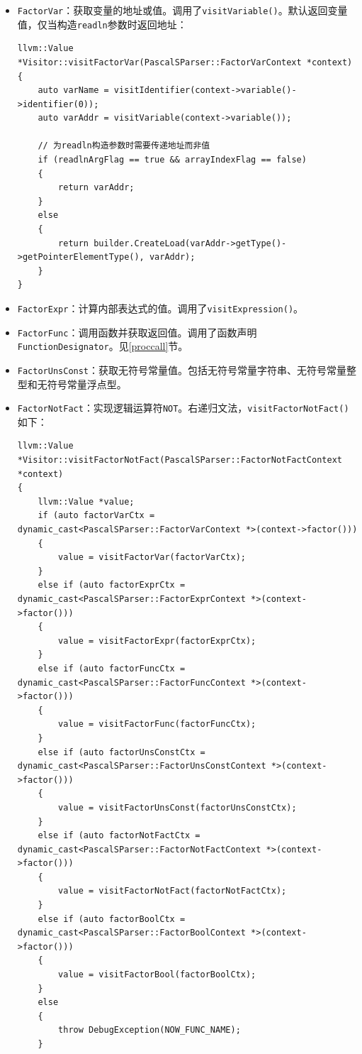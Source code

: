\documentclass[lang=cn,11pt,a4paper,cite=authornum]{paper}
\begin{document}
\begin{itemize}
    \item \texttt{FactorVar}：获取变量的地址或值。调用了\texttt{visitVariable()}。默认返回变量值，仅当构造\texttt{readln}参数时返回地址：
          \begin{code}
              \begin{verbatim}
llvm::Value *Visitor::visitFactorVar(PascalSParser::FactorVarContext *context)
{
    auto varName = visitIdentifier(context->variable()->identifier(0));
    auto varAddr = visitVariable(context->variable());

    // 为readln构造参数时需要传递地址而非值
    if (readlnArgFlag == true && arrayIndexFlag == false)
    {
        return varAddr;
    }
    else
    {
        return builder.CreateLoad(varAddr->getType()->getPointerElementType(), varAddr);
    }
}
    \end{verbatim}
          \end{code}
    \item \texttt{FactorExpr}：计算内部表达式的值。调用了\texttt{visitExpression()}。
    \item \texttt{FactorFunc}：调用函数并获取返回值。调用了函数声明\texttt{FunctionDesignator}。见\ref{proccall}节。
    \item \texttt{FactorUnsConst}：获取无符号常量值。包括无符号常量字符串、无符号常量整型和无符号常量浮点型。
    \item \texttt{FactorNotFact}：实现逻辑运算符\texttt{NOT}。右递归文法，\texttt{visitFactorNotFact()}如下：
          \begin{code}
              \begin{verbatim}
llvm::Value *Visitor::visitFactorNotFact(PascalSParser::FactorNotFactContext *context)
{
    llvm::Value *value;
    if (auto factorVarCtx = dynamic_cast<PascalSParser::FactorVarContext *>(context->factor()))
    {
        value = visitFactorVar(factorVarCtx);
    }
    else if (auto factorExprCtx = dynamic_cast<PascalSParser::FactorExprContext *>(context->factor()))
    {
        value = visitFactorExpr(factorExprCtx);
    }
    else if (auto factorFuncCtx = dynamic_cast<PascalSParser::FactorFuncContext *>(context->factor()))
    {
        value = visitFactorFunc(factorFuncCtx);
    }
    else if (auto factorUnsConstCtx = dynamic_cast<PascalSParser::FactorUnsConstContext *>(context->factor()))
    {
        value = visitFactorUnsConst(factorUnsConstCtx);
    }
    else if (auto factorNotFactCtx = dynamic_cast<PascalSParser::FactorNotFactContext *>(context->factor()))
    {
        value = visitFactorNotFact(factorNotFactCtx);
    }
    else if (auto factorBoolCtx = dynamic_cast<PascalSParser::FactorBoolContext *>(context->factor()))
    {
        value = visitFactorBool(factorBoolCtx);
    }
    else
    {
        throw DebugException(NOW_FUNC_NAME);
    }


\end{verbatim}
\end{code}
\end{itemize}
\end{document}
